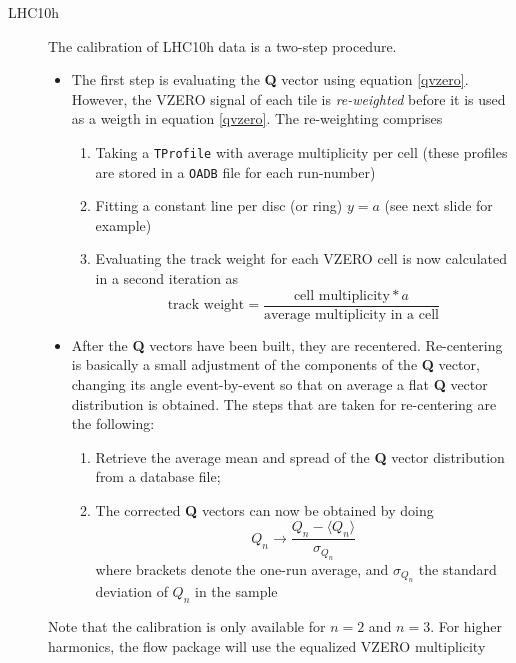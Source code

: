 \documentclass[a4paper]{book}
\numberwithin{equation}{subsection}
\begin{document}
\begin{description}
    \item [LHC10h]
The calibration of LHC10h data is a two-step procedure. 
\begin{itemize}
\item The first step is evaluating the \textbf{Q} vector using equation \ref{qvzero}. However, the VZERO signal of each tile is \emph{re-weighted} before it is used as a weigth in equation \ref{qvzero}. The re-weighting comprises 
\begin{enumerate}
\item Taking a \texttt{TProfile} with average multiplicity per cell (these profiles are stored in a \texttt{OADB} file for each run-number)
\item Fitting a constant line per disc (or ring) $y = a$ (see next slide for example)
\item Evaluating the track weight for each VZERO cell is now calculated in a second iteration as
\begin{equation}
\mbox{track weight} = \frac{\mbox{cell multiplicity} * a}{\mbox{average multiplicity in a cell}} 
\end{equation}
\end{enumerate}
\item After the \textbf{Q} vectors have been built, they are recentered. Re-centering is basically a small adjustment of the components of the \textbf{Q} vector, changing its angle event-by-event so that on average a flat \textbf{Q} vector distribution is obtained. The steps that are taken for re-centering are the following:
\begin{enumerate}
\item Retrieve the average mean and spread of the \textbf{Q} vector distribution from a database file;
\item The corrected \textbf{Q} vectors can now be obtained by doing
\begin{equation}
Q_n \longrightarrow \frac{Q_n - \langle Q_n \rangle }{\sigma_{Q_n}} 
\end{equation}
where brackets denote the one-run average, and $\sigma_{Q_n}$ the standard deviation of $Q_n$ in the sample
\end{enumerate}
\end{itemize}
Note that the calibration is only available for $n=2$ and $n=3$. For higher harmonics, the flow package will use the equalized VZERO multiplicity
\begin{lstlisting}[language=C, numbers=left]

\end{lstlisting}
\end{description}
\end{document}
